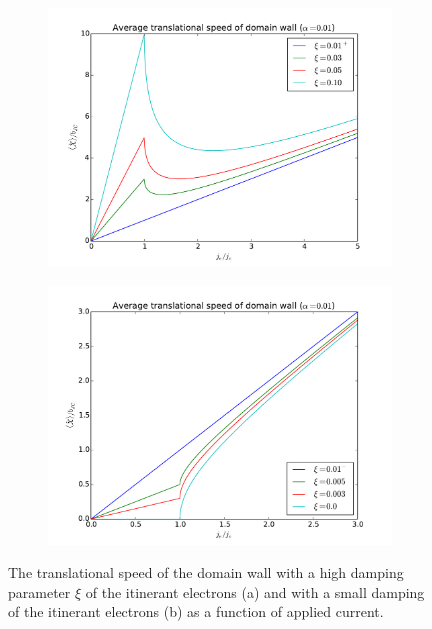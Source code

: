 \documentclass[12pt, a4paper, twoside, openright]{article}		%
\numberwithin{equation}{section}
\begin{document}
\begin{figure}[h!]
\centering
\begin{subfigure}{.5\textwidth}
  \centering
  \includegraphics[width=1.0\linewidth]{Figures/walkerBreakdown}
  \caption{}
  \label{fig:walkerBreakdown}
\end{subfigure}%
\begin{subfigure}{.5\textwidth}
  \centering
  \includegraphics[width=1.0\linewidth]{Figures/criticalCurrentXdot}
  \caption{}
  \label{fig:criticalCurrent}
\end{subfigure}
\caption{The translational speed of the domain wall with a high damping parameter $\xi$ of the itinerant electrons (a) and with a small damping of the itinerant electrons (b) as a function of applied current.}
\label{fig:Xdot_afo_current}
\end{figure}
\end{document}
